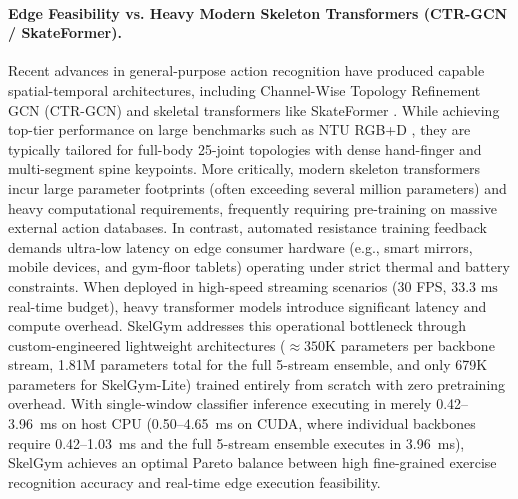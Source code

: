 \documentclass[runningheads]{llncs}
\begin{document}
\paragraph{Edge Feasibility vs. Heavy Modern Skeleton Transformers (CTR-GCN / SkateFormer).}
Recent advances in general-purpose action recognition have produced capable spatial-temporal architectures, including Channel-Wise Topology Refinement GCN (CTR-GCN) \cite{chen2021channel} and skeletal transformers like SkateFormer \cite{zheng2024skateformer}. While achieving top-tier performance on large benchmarks such as NTU RGB+D \cite{shahroudy2016}, they are typically tailored for full-body 25-joint topologies with dense hand-finger and multi-segment spine keypoints. More critically, modern skeleton transformers incur large parameter footprints (often exceeding several million parameters) and heavy computational requirements, frequently requiring pre-training on massive external action databases.
In contrast, automated resistance training feedback demands ultra-low latency on edge consumer hardware (e.g., smart mirrors, mobile devices, and gym-floor tablets) operating under strict thermal and battery constraints. When deployed in high-speed streaming scenarios (30 FPS, $33.3\text{ ms}$ real-time budget), heavy transformer models introduce significant latency and compute overhead. SkelGym addresses this operational bottleneck through custom-engineered lightweight architectures ($\approx 350\text{K}$ parameters per backbone stream, 1.81M parameters total for the full 5-stream ensemble, and only 679K parameters for SkelGym-Lite) trained entirely from scratch with zero pretraining overhead. With single-window classifier inference executing in merely 0.42--3.96~ms on host CPU (0.50--4.65~ms on CUDA, where individual backbones require 0.42--1.03~ms and the full 5-stream ensemble executes in 3.96~ms), SkelGym achieves an optimal Pareto balance between high fine-grained exercise recognition accuracy and real-time edge execution feasibility.
\end{document}
